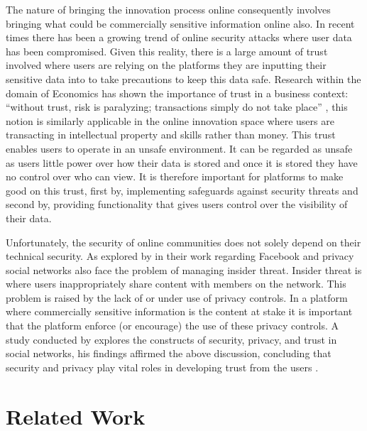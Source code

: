 The nature of bringing the innovation process online consequently involves bringing what could be commercially sensitive information online also. In recent times there has been a growing trend of online security attacks where user data has been compromised. Given this reality, there is a large amount of trust involved where users are relying on the platforms they are inputting their sensitive data into to take precautions to keep this data safe. Research within the domain of Economics has shown the importance of trust in a business context: ``without trust, risk is paralyzing; transactions simply do not take place'' \cite{boyd2002community}, this notion is similarly applicable in the online innovation space where users are transacting in intellectual property and skills rather than money. This trust enables users to operate in an unsafe environment. It can be regarded as unsafe as users little power over how their data is stored and once it is stored they have no control over who can view. It is therefore important for platforms to make good on this trust, first by, implementing safeguards against security threats and second by, providing functionality that gives users control over the visibility of their data.
\par
Unfortunately, the security of online communities does not solely depend on their technical security. As explored by \citeauthor{johnson2012facebook} in their work regarding Facebook and privacy \cite{johnson2012facebook} social networks also face the problem of managing insider threat. Insider threat is where users inappropriately share content with members on the network. This problem is raised by the lack of or under use of privacy controls. In a platform where commercially sensitive information is the content at stake it is important that the platform enforce (or encourage) the use of these privacy controls. A study conducted by \citeauthor{shin2010effects} explores the constructs of security, privacy, and trust in social networks, his findings affirmed the above discussion, concluding that security and privacy play vital roles in developing trust from the users \cite{shin2010effects}.

\section{Related Work}

